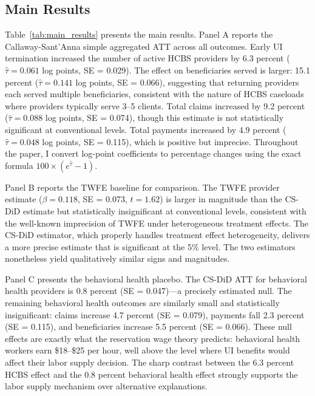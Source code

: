 \documentclass[12pt]{article}
\begin{document}
\subsection{Main Results}

Table~\ref{tab:main_results} presents the main results. Panel A reports the Callaway-Sant'Anna simple aggregated ATT across all outcomes. Early UI termination increased the number of active HCBS providers by 6.3 percent ($\hat{\tau} = 0.061$ log points, SE = 0.029). The effect on beneficiaries served is larger: 15.1 percent ($\hat{\tau} = 0.141$ log points, SE = 0.066), suggesting that returning providers each served multiple beneficiaries, consistent with the nature of HCBS caseloads where providers typically serve 3--5 clients. Total claims increased by 9.2 percent ($\hat{\tau} = 0.088$ log points, SE = 0.074), though this estimate is not statistically significant at conventional levels. Total payments increased by 4.9 percent ($\hat{\tau} = 0.048$ log points, SE = 0.115), which is positive but imprecise. Throughout the paper, I convert log-point coefficients to percentage changes using the exact formula $100 \times (e^{\hat{\tau}} - 1)$.

Panel B reports the TWFE baseline for comparison. The TWFE provider estimate ($\beta = 0.118$, SE = 0.073, $t = 1.62$) is larger in magnitude than the CS-DiD estimate but statistically insignificant at conventional levels, consistent with the well-known imprecision of TWFE under heterogeneous treatment effects. The CS-DiD estimator, which properly handles treatment effect heterogeneity, delivers a more precise estimate that is significant at the 5\% level. The two estimators nonetheless yield qualitatively similar signs and magnitudes.

Panel C presents the behavioral health placebo. The CS-DiD ATT for behavioral health providers is 0.8 percent (SE = 0.047)---a precisely estimated null. The remaining behavioral health outcomes are similarly small and statistically insignificant: claims increase 4.7 percent (SE = 0.079), payments fall 2.3 percent (SE = 0.115), and beneficiaries increase 5.5 percent (SE = 0.066). These null effects are exactly what the reservation wage theory predicts: behavioral health workers earn \$18--\$25 per hour, well above the level where UI benefits would affect their labor supply decision. The sharp contrast between the 6.3 percent HCBS effect and the 0.8 percent behavioral health effect strongly supports the labor supply mechanism over alternative explanations.
\end{document}
